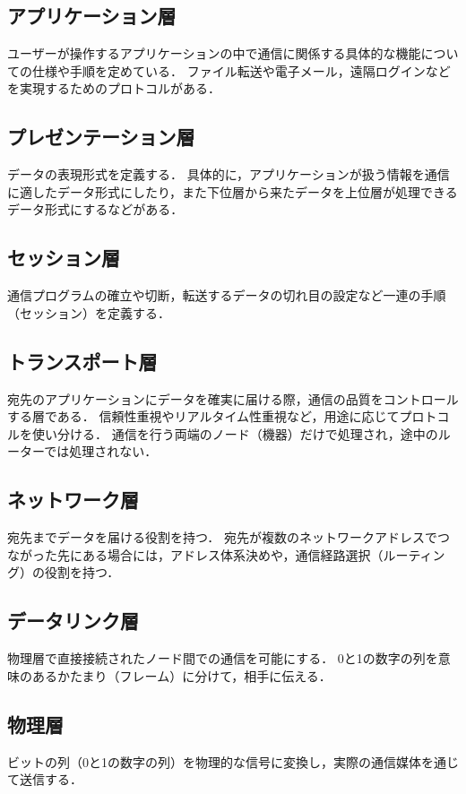 \documentclass[12pt,a4j,titlepage]{ltjsarticle}
\begin{document}
\subsection{アプリケーション層}
ユーザーが操作するアプリケーションの中で通信に関係する具体的な機能についての仕様や手順を定めている．
ファイル転送や電子メール，遠隔ログインなどを実現するためのプロトコルがある．

\subsection{プレゼンテーション層}
データの表現形式を定義する．
具体的に，アプリケーションが扱う情報を通信に適したデータ形式にしたり，また下位層から来たデータを上位層が処理できるデータ形式にするなどがある．

\subsection{セッション層}
通信プログラムの確立や切断，転送するデータの切れ目の設定など一連の手順（セッション）を定義する．

\subsection{トランスポート層}
宛先のアプリケーションにデータを確実に届ける際，通信の品質をコントロールする層である．
信頼性重視やリアルタイム性重視など，用途に応じてプロトコルを使い分ける．
通信を行う両端のノード（機器）だけで処理され，途中のルーターでは処理されない．

\subsection{ネットワーク層}
宛先までデータを届ける役割を持つ．
宛先が複数のネットワークアドレスでつながった先にある場合には，アドレス体系決めや，通信経路選択（ルーティング）の役割を持つ．

\subsection{データリンク層}
物理層で直接接続されたノード間での通信を可能にする．
0と1の数字の列を意味のあるかたまり（フレーム）に分けて，相手に伝える．

\subsection{物理層}
ビットの列（0と1の数字の列）を物理的な信号に変換し，実際の通信媒体を通じて送信する．
\end{document}
